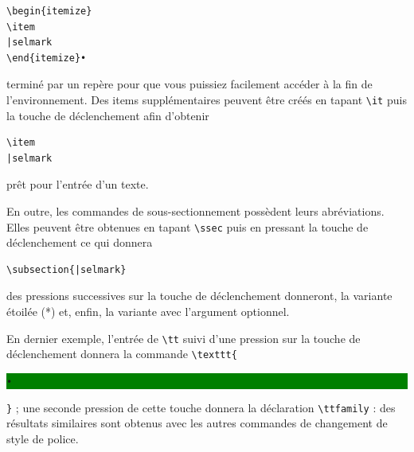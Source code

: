 \documentclass[11pt,french]{article}
\newcommand{\cmd}[1]{\textsf{#1}}
\newcommand{\selmark}{\colorbox{green}{\rule[-0.5ex]{0ex}{2.1ex}\texttt{•}}}
\begin{document}
%
\begin{verbatim}
\begin{itemize}
\item
|selmark
\end{itemize}•
\end{verbatim}
terminé par un repère pour que vous puissiez facilement accéder à la fin de l'environnement. Des items supplémentaires peuvent être créés en tapant \verb|\it| puis la touche de déclenchement afin d'obtenir
\begin{verbatim}
\item
|selmark
\end{verbatim}
prêt pour l'entrée d'un texte.

En outre, les commandes de sous-sectionnement possèdent leurs abréviations. Elles peuvent être obtenues en tapant  \verb|\ssec| puis en pressant la touche de déclenchement ce qui donnera

\begin{verbatim}
\subsection{|selmark}
\end{verbatim}
des pressions successives sur la touche de déclenchement donneront, la variante étoilée (*) et, enfin, la variante avec l'argument optionnel.

En dernier exemple, l'entrée de \verb|\tt| suivi d'une pression sur la touche de déclenchement donnera la commande \verb|\texttt{|\selmark\verb|}| ; une seconde pression de cette touche donnera la déclaration \verb|\ttfamily| : des résultats similaires sont obtenus avec les autres commandes de changement de style de police.
\end{document}
